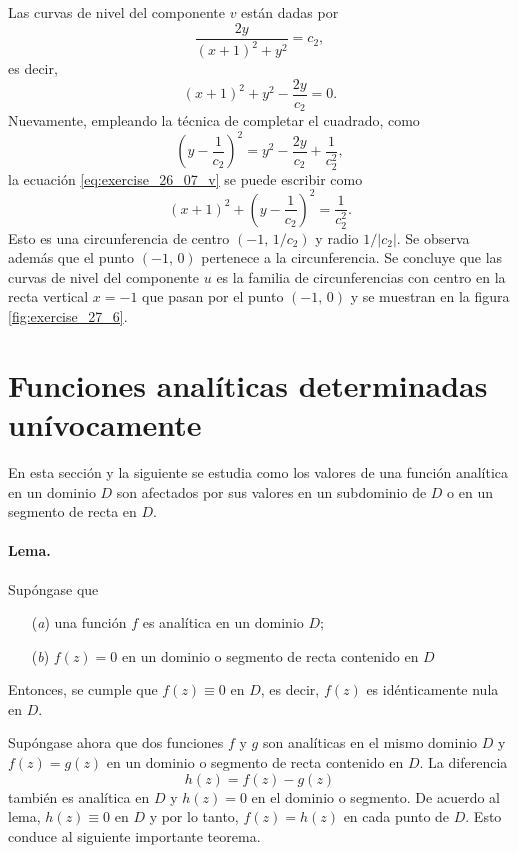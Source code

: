\documentclass[a4paper]{report}
\begin{document}
Las curvas de nivel del componente \(v\) están dadas por 
\[
 \frac{2y}{(x+1)^2+y^2}=c_2,
\]
es decir,
\begin{equation}\label{eq:exercise_26_07_v}
 (x+1)^2+y^2-\frac{2y}{c_2}=0.
\end{equation}
Nuevamente, empleando la técnica de completar el cuadrado, como
\[
 \left(y-\frac{1}{c_2}\right)^2=y^2-\frac{2y}{c_2}+\frac{1}{c_2^2},
\]
la ecuación \ref{eq:exercise_26_07_v} se puede escribir como
\[
 (x+1)^2+\left(y-\frac{1}{c_2}\right)^2=\frac{1}{c_2^2}.
\]
Esto es una circunferencia de centro \((-1,\,1/c_2)\) y radio \(1/|c_2|\). Se observa además que el punto \((-1,\,0)\) pertenece a la circunferencia. Se concluye que las curvas de nivel del componente \(u\) es la familia de circunferencias con centro en la recta vertical \(x=-1\) que pasan por el punto \((-1,\,0)\) y se muestran en la figura \ref{fig:exercise_27_6}.

\section{Funciones analíticas determinadas unívocamente}\label{sec:uniquely_determined_analytic_functions}

En esta sección y la siguiente se estudia como los valores de una función analítica en un dominio \(D\) son afectados por sus valores en un subdominio de \(D\) o en un segmento de recta en \(D\). 

\paragraph{Lema.} Supóngase que 
\begin{enumerate}
 \item[(\textit{a})] una función \(f\) es analítica en un dominio \(D\);
 \item[(\textit{b})] \(f(z)=0\) en un dominio o segmento de recta contenido en \(D\)
\end{enumerate}
Entonces, se cumple que \(f(z)\equiv0\) en \(D\), es decir, \(f(z)\) es idénticamente nula en \(D\).

Supóngase ahora que dos funciones \(f\) y \(g\) son analíticas en el mismo dominio \(D\) y \(f(z)=g(z)\) en un dominio o segmento de recta contenido en \(D\). La diferencia
\[
 h(z)=f(z)-g(z)
\]
también es analítica en \(D\) y \(h(z)=0\) en el dominio o segmento. De acuerdo al lema, \(h(z)\equiv0\) en \(D\) y por lo tanto, \(f(z)=h(z)\) en cada punto de \(D\). Esto conduce al siguiente importante teorema.
\end{document}
